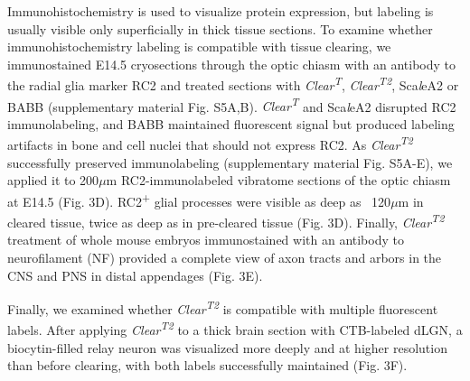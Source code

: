 Immunohistochemistry is used to visualize protein expression, but labeling is usually visible only superficially in thick tissue sections.
To examine whether immunohistochemistry labeling is compatible with tissue clearing, we immunostained E14.5 cryosections through the optic chiasm with an antibody to the radial glia marker RC2 and treated sections with \emph{Clear\textsuperscript{T}}, \emph{Clear\textsuperscript{T2}}, Sca\emph{l}eA2 or BABB (supplementary material Fig. S5A,B).
\emph{Clear\textsuperscript{T}} and Sca\emph{l}eA2 disrupted RC2 immunolabeling, and BABB maintained fluorescent signal but produced labeling artifacts in bone and cell nuclei that should not express RC2.
As \emph{Clear\textsuperscript{T2}} successfully preserved immunolabeling (supplementary material Fig. S5A-E), we applied it to 200$\mu$m RC2-immunolabeled vibratome sections of the optic chiasm at E14.5 (Fig. 3D).
RC2\textsuperscript{+} glial processes were visible as deep as ~120$\mu$m in cleared tissue, twice as deep as in pre-cleared tissue (Fig. 3D).
Finally, \emph{Clear\textsuperscript{T2}} treatment of whole mouse embryos immunostained with an antibody to neurofilament (NF) provided a complete view of axon tracts and arbors in the CNS and PNS in distal appendages (Fig. 3E).

Finally, we examined whether \emph{Clear\textsuperscript{T2}} is compatible with multiple fluorescent labels.
After applying \emph{Clear\textsuperscript{T2}} to a thick brain section with CTB-labeled dLGN, a biocytin-filled relay neuron was visualized more deeply and at higher resolution than before clearing, with both labels successfully maintained (Fig. 3F).
